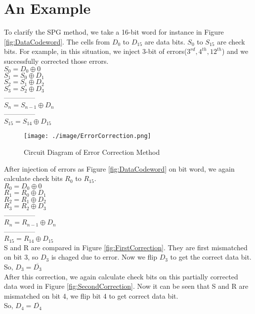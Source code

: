 \documentclass[12pt,a4paper]{report}
\begin{document}
 \section{An Example}
 To clarify the SPG method, we take a 16-bit word for instance in Figure \ref{fig:DataCodeword}. The cells from $D_0$ to  $D_{15}$ are data bits. $S_0$ to $S_{15}$ are check bits. For example, in this situation, we inject 3-bit of errors($3^{rd},4^{th},12^{th}$) and we successfully corrected those errors.\\
 $S_0 = D_0 \oplus 0$\\
 $S_1 = S_0 \oplus D_1$\\
 $S_2 = S_1 \oplus D_2$\\
 $S_3 = S_2 \oplus D_3$\\
 --------------\\
 $S_n = S_{n-1} \oplus D_n$\\
 --------------\\
 $S_{15} = S_{14} \oplus D_{15}$\\
 
  \begin{figure}
   \centering
    \texttt{[image: ./image/ErrorCorrection.png]}
    \caption{Circuit Diagram of Error Correction Method}
    \label{fig:ErrorCorrection}
   \end{figure}
  
After injection of errors as Figure \ref{fig:DataCodeword} on bit word, we again calculate check bits $R_0$ to $R_{15}$.\\
$R_0 = D_0 \oplus 0$\\
$R_1 = R_0 \oplus D_1$\\
 $R_2 = R_1 \oplus D_2$\\
 $R_3 = R_2 \oplus D_3$\\
 --------------\\
 $R_n = R_{n-1} \oplus D_n$\\
 --------------\\
 $R_{15} = R_{14} \oplus D_{15}$\\ 
S and R are compared in Figure \ref{fig:FirstCorrection}. They are first mismatched on bit 3, so $D_3$ is chaged due to error. Now we flip $D_3$ to get the correct data bit.\\
So, $D_3 =\overline{D_3}$\\
After this correction, we again calculate check bits on this partially corrected data word in Figure \ref{fig:SecondCorrection}. Now it can be seen that S and R are mismatched on bit 4, we flip bit 4 to get correct data bit.\\
So, $D_4=\overline{D_4}$
\end{document}

